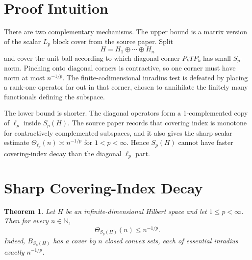 \documentclass[11pt]{article}
\newtheorem{theorem}{Theorem}
\newcommand{\N}{\mathbb N}
\begin{document}
\section*{Proof Intuition}

There are two complementary mechanisms.  The upper bound is a matrix version
of the scalar \(L_p\) block cover from the source paper.  Split
\[
  H=H_1\oplus\cdots\oplus H_n
\]
and cover the unit ball according to which diagonal corner
\(P_kTP_k\) has small \(S_p\)-norm.  Pinching onto diagonal corners is
contractive, so one corner must have norm at most \(n^{-1/p}\).  The
finite-codimensional inradius test is defeated by placing a rank-one operator
far out in that corner, chosen to annihilate the finitely many functionals
defining the subspace.

The lower bound is shorter.  The diagonal operators form a 1-complemented copy
of \(\ell_p\) inside \(S_p(H)\).  The source paper records that covering index
is monotone for contractively complemented subspaces, and it also gives the
sharp scalar estimate \(\Theta_{\ell_p}(n)\asymp n^{-1/p}\) for
\(1<p<\infty\).  Hence \(S_p(H)\) cannot have faster covering-index decay than
the diagonal \(\ell_p\) part.

\section*{Sharp Covering-Index Decay}

\begin{theorem}\label{thm:schatten-upper}
Let \(H\) be an infinite-dimensional Hilbert space and let
\(1\le p<\infty\).  Then for every \(n\in\N\),
\[
  \Theta_{S_p(H)}(n)\le n^{-1/p}.
\]
Indeed, \(B_{S_p(H)}\) has a cover by \(n\) closed convex sets, each of
essential inradius exactly \(n^{-1/p}\).
\end{theorem}
\end{document}
